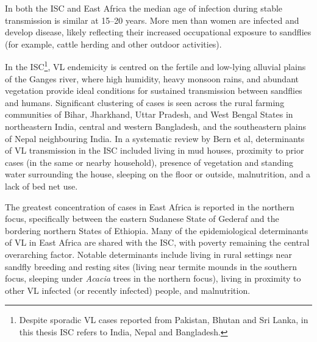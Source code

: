 In both the ISC and East Africa the median age of infection during stable transmission is similar at 15--20 years. More men than women are infected and develop disease, likely reflecting their increased occupational exposure to sandflies (for example, cattle herding and other outdoor activities)\cite{who_wer2023}.



In the ISC\footnote{Despite sporadic VL cases reported from Pakistan, Bhutan and Sri Lanka, in this thesis ISC refers to India, Nepal and Bangladesh.}, VL endemicity is centred on the fertile and low-lying alluvial plains of the Ganges river, where high humidity, heavy monsoon rains, and abundant vegetation provide ideal conditions for sustained transmission between sandflies and humans\cite{bhunia2010}. Significant clustering of cases is seen across the rural farming communities of Bihar, Jharkhand, Uttar Pradesh, and West Bengal States in northeastern India, central and western Bangladesh, and the southeastern plains of Nepal neighbouring India. In a systematic review by Bern et al, determinants of VL transmission in the ISC included living in mud houses, proximity to prior cases (in the same or nearby household), presence of vegetation and standing water surrounding the house, sleeping on the floor or outside, malnutrition, and a lack of bed net use\cite{bern2010}.

The greatest concentration of cases in East Africa is reported in the northern focus, specifically between the eastern Sudanese State of Gederaf and the bordering northern States of Ethiopia. Many of the epidemiological determinants of VL in East Africa are shared with the ISC, with poverty remaining the central overarching factor. Notable determinants include living in rural settings near sandfly breeding and resting sites (living near termite mounds in the southern focus, sleeping under \textit{Acacia} trees in the northern focus), living in proximity to other VL infected (or recently infected) people, and malnutrition\cite{geto2024}.


